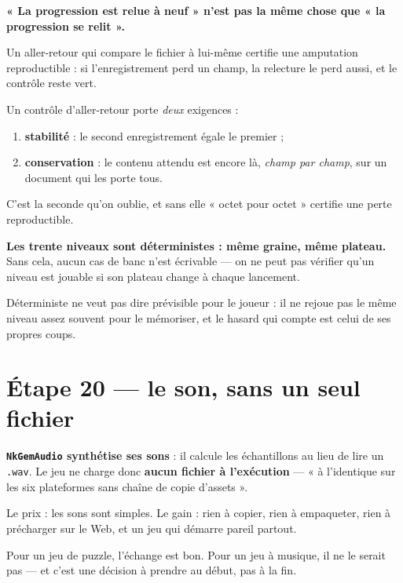 \begin{nkpiege}
\textbf{« La progression est relue à neuf » n'est pas la même chose que « la
progression se relit ».}

Un aller-retour qui compare le fichier à lui-même certifie une amputation
reproductible : si l'enregistrement perd un champ, la relecture le perd aussi, et
le contrôle reste vert.

Un contrôle d'aller-retour porte \emph{deux} exigences :
\begin{enumerate}
\item \textbf{stabilité} : le second enregistrement égale le premier ;
\item \textbf{conservation} : le contenu attendu est encore là, \emph{champ par
      champ}, sur un document qui les porte tous.
\end{enumerate}
C'est la seconde qu'on oublie, et sans elle « octet pour octet » certifie une
perte reproductible.
\end{nkpiege}

\begin{nkretenir}
\textbf{Les trente niveaux sont déterministes : même graine, même plateau.}
Sans cela, aucun cas de banc n'est écrivable --- on ne peut pas vérifier qu'un
niveau est jouable si son plateau change à chaque lancement.

Déterministe ne veut pas dire prévisible pour le joueur : il ne rejoue pas le
même niveau assez souvent pour le mémoriser, et le hasard qui compte est celui
de ses propres coups.
\end{nkretenir}

\section{Étape 20 --- le son, sans un seul fichier}

\begin{nkretenir}
\textbf{\texttt{NkGemAudio} synthétise ses sons} : il calcule les échantillons au
lieu de lire un \texttt{.wav}. Le jeu ne charge donc \textbf{aucun fichier à
l'exécution} --- « à l'identique sur les six plateformes sans chaîne de copie
d'assets ».

Le prix : les sons sont simples. Le gain : rien à copier, rien à empaqueter,
rien à précharger sur le Web, et un jeu qui démarre pareil partout.

Pour un jeu de puzzle, l'échange est bon. Pour un jeu à musique, il ne le
serait pas --- et c'est une décision à prendre au début, pas à la fin.
\end{nkretenir}

